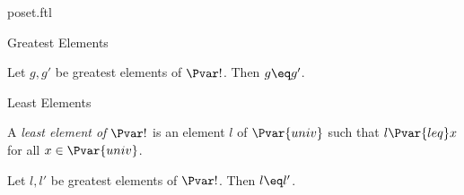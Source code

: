 \documentclass{naproche-library}
\begin{document}
\begin{smodule}[title=Posets]{poset.ftl}
\begin{sfragment}{Greatest Elements}
  \begin{proposition}[forthel,id=GreatestElementIsUniqueThm]
    Let $g, g'$ be greatest elements of $\Pvar!$.
    Then $g\eq g'$.
  \end{proposition}
\end{sfragment}

\begin{sfragment}{Least Elements}
  \begin{definition}[forthel,id=LeastElementDef]
    A \emph{least element of $\Pvar!$} is an element $l$ of $\Pvar{univ}$ such that $l {\Pvar{leq}} x$ for all $x \in \Pvar{univ}$.
  \end{definition}

  \begin{proposition}[forthel,id=LeastElementIsUniqueThm]
    Let $l, l'$ be greatest elements of $\Pvar!$.
    Then $l\eq l'$.
  \end{proposition}
\end{sfragment}
\end{smodule}
\end{document}

